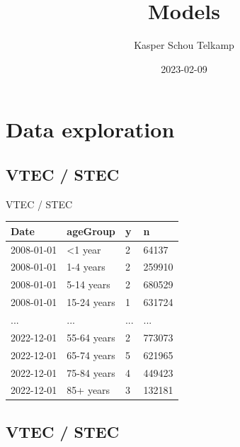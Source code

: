 \documentclass[aspectratio=169]{beamer}
\title[Automated and Early Detection of Disease Outbreaks]{Models}
\author{Kasper Schou Telkamp}
\institute{Section for Dynamical Systems}
\date{2023-02-09}
\begin{document}
\frame{
	\maketitle
}


\hypertarget{data-exploration}{%
\section{Data exploration}\label{data-exploration}}

\hypertarget{vtec-stec}{%
\subsection*{VTEC / STEC}\label{vtec-stec}}

\begin{frame}{VTEC / STEC}
\tiny

\begin{table}
\centering\begingroup\fontsize{12}{14}\selectfont

\begin{tabular}{llll}
\toprule
Date & ageGroup & y & n\\
\midrule
2008-01-01 & <1 year & 2 & 64137\\
2008-01-01 & 1-4 years & 2 & 259910\\
2008-01-01 & 5-14 years & 2 & 680529\\
2008-01-01 & 15-24 years & 1 & 631724\\
... & ... & ... & ...\\
2022-12-01 & 55-64 years & 2 & 773073\\
2022-12-01 & 65-74 years & 5 & 621965\\
2022-12-01 & 75-84 years & 4 & 449423\\
2022-12-01 & 85+ years & 3 & 132181\\
\bottomrule
\end{tabular}
\endgroup{}
\end{table}

\normalsize
\end{frame}

\hypertarget{vtec-stec-1}{%
\subsection{VTEC / STEC}\label{vtec-stec-1}}
\end{document}
